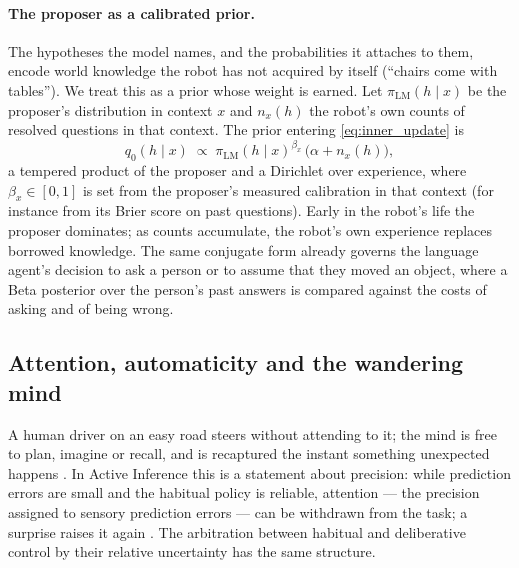 \paragraph{The proposer as a calibrated prior.}
The hypotheses the model names, and the probabilities it attaches to them, encode world knowledge the robot has
not acquired by itself (``chairs come with tables''). We treat this as a prior whose weight is earned. Let
$\pi_{\text{LM}}(h \mid x)$ be the proposer's distribution in context $x$ and $n_x(h)$ the robot's own counts of
resolved questions in that context. The prior entering \eqref{eq:inner_update} is
\begin{equation}
    q_0(h \mid x) \;\propto\; \pi_{\text{LM}}(h \mid x)^{\beta_x}\, \big(\alpha + n_x(h)\big),
    \label{eq:inner_prior}
\end{equation}
a tempered product of the proposer and a Dirichlet over experience, where $\beta_x \in [0,1]$ is set from the
proposer's measured calibration in that context (for instance from its Brier score on past questions). Early in
the robot's life the proposer dominates; as counts accumulate, the robot's own experience replaces borrowed
knowledge. The same conjugate form already governs the language agent's decision to ask a person or to assume
that they moved an object, where a Beta posterior over the person's past answers is compared against the costs of
asking and of being wrong.

\subsection{Attention, automaticity and the wandering mind}
\label{sec:inner_speech:modes}

A human driver on an easy road steers without attending to it; the mind is free to plan, imagine or recall, and is
recaptured the instant something unexpected happens \cite{smallwood2015science, christoff2016mind}. In Active
Inference this is a statement about precision: while prediction errors are small and the habitual policy is
reliable, attention --- the precision assigned to sensory prediction errors --- can be withdrawn from the task; a
surprise raises it again \cite{feldman2010attention}. The arbitration between habitual and deliberative control by
their relative uncertainty \cite{daw2005uncertainty} has the same structure.

